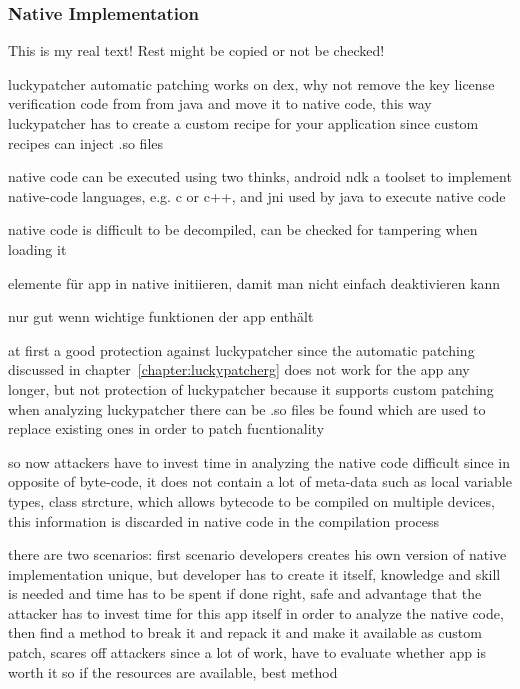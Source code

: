 \subsubsection{Native Implementation} \label{subsection:counter-modifications-dynamic}
This is my real text! Rest might be copied or not be checked!

luckypatcher automatic patching works on dex, why not remove the key license verification code from from java and move it to native code, this way luckypatcher has to create a custom recipe for your application since custom recipes can inject .so files

native code can be executed using two thinks, android ndk a toolset to implement native-code languages, e.g. c or c++, and  \gls{jni} used by java to execute native code

native code is difficult to be decompiled, can be checked for tampering when loading it

elemente für app in native initiieren, damit man nicht einfach deaktivieren kann

nur gut wenn wichtige funktionen der app enthält



at first a good protection against luckypatcher since the automatic patching discussed in chapter~\ref{chapter:luckypatcherg} does not work for the app any longer, but not protection of luckypatcher because it supports custom patching
when analyzing luckypatcher there can be .so files be found which are used to replace existing ones in order to patch fucntionality

so now attackers have to invest time in analyzing the native code
difficult since in opposite of byte-code, it does not contain a lot of meta-data such as local variable types, class strcture, which allows bytecode to be compiled on multiple devices, this information is discarded in native code in the compilation process

there are two scenarios:
first scenario
developers creates his own version of native implementation
unique, but developer has to create it itself, knowledge and skill is needed and time has to be spent
if done right, safe and advantage that the attacker has to invest time for this app itself in order to analyze the native code, then find a method to break it and repack it and make it available as custom patch, scares off attackers since a lot of work, have to evaluate whether app is worth it
so if the resources are available, best method

